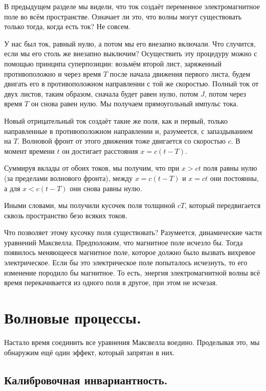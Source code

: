 \documentclass[12pt,a4paper]{article}
\numberwithin{equation}{section}
\numberwithin{equation}{section}
\begin{document}
В предыдущем разделе мы видели, что ток создаёт переменное
электромагнитное поле во всём пространстве. Означает ли это, что волны
могут существовать только тогда, когда есть ток? Не совсем.

У нас был ток, равный нулю, а потом мы его внезапно включали. Что
случится, если мы его столь же внезапно выключим? Осуществить эту
процедуру можно с помощью принципа суперпозиции: возьмём второй лист,
заряженный противоположно и через время $T$ после начала движения
первого листа, будем двигать его в противоположном направлении с той
же скоростью. Полный ток от двух листов, таким образом, сначала будет
равен нулю, потом $J$, потом через время $T$ он снова равен нулю. Мы
получаем прямоугольный импульс тока. 

Новый отрицательный ток создаёт такие же поля, как и первый, только
направленные в противоположном направлении и, разумеется, с
запаздыванием на $T$. Волновой фронт от этого движения тоже двигается
со скоростью $c$. В момент времени $t$ он достигает расстояния $x = c
(t-T)$. 

Суммируя вклады от обоих токов, мы получим, что при $x>ct$ поля равны
нулю (за пределами волнового фронта), между $x=c(t-T)$ и $x=ct$ они
постоянны, а для $x<c(t-T)$ они снова равны нулю. 

Иными словами, мы получили кусочек поля толщиной $cT$, который
передвигается сквозь пространство безо всяких токов. 

Что позволяет этому кусочку поля существовать? Разумеется,
динамические части уравнений Максвелла. Предположим, что магнитное
поле исчезло бы. Тогда появилось меняющееся магнитное поле, которое
должно было вызвать вихревое электрическое. Если бы это электрическое
поле попыталось исчезнуть, то его изменение породило бы магнитное. То
есть, энергия электромагнитной волны всё время перекачивается из
одного поля в другое, при этом не исчезая. 

\section{Волновые процессы.}
\label{sec:waves}

Настало время соединить все уравнения Максвелла воедино. Проделывая
это, мы обнаружим ещё один эффект, который запрятан в них. 

\subsection{Калибровочная инвариантность.}
\label{gauge}
\end{document}
